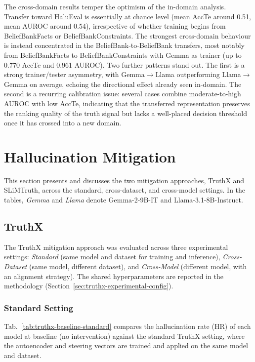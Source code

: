 The cross-domain results temper the optimism of the in-domain analysis. Transfer toward HaluEval is essentially at chance level (mean AccTe around 0.51, mean AUROC around 0.54), irrespective of whether training begins from BeliefBankFacts or BeliefBankConstraints. The strongest cross-domain behaviour is instead concentrated in the BeliefBank-to-BeliefBank transfers, most notably from BeliefBankFacts to BeliefBankConstraints with Gemma as trainer (up to 0.770 AccTe and 0.961 AUROC). Two further patterns stand out. The first is a strong trainer/tester asymmetry, with Gemma$\rightarrow$Llama outperforming Llama$\rightarrow$Gemma on average, echoing the directional effect already seen in-domain. The second is a recurring calibration issue: several cases combine moderate-to-high AUROC with low AccTe, indicating that the transferred representation preserves the ranking quality of the truth signal but lacks a well-placed decision threshold once it has crossed into a new domain.

\section{Hallucination Mitigation}

This section presents and discusses the two mitigation approaches, TruthX and SLiMTruth, across the standard, cross-dataset, and cross-model settings. In the tables, \textit{Gemma} and \textit{Llama} denote Gemma-2-9B-IT and Llama-3.1-8B-Instruct.

\subsection{TruthX}

The TruthX mitigation approach was evaluated across three experimental settings: \textit{Standard} (same model and dataset for training and inference), \textit{Cross-Dataset} (same model, different dataset), and \textit{Cross-Model} (different model, with an alignment strategy). The shared hyperparameters are reported in the methodology (Section~\ref{sec:truthx-experimental-config}).

\subsubsection{Standard Setting}

Tab.~\ref{tab:truthx-baseline-standard} compares the hallucination rate (HR) of each model at baseline (no intervention) against the standard TruthX setting, where the autoencoder and steering vectors are trained and applied on the same model and dataset.

